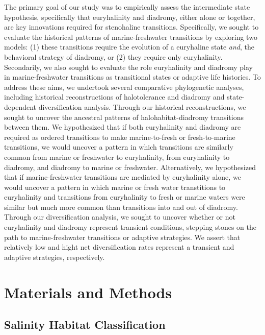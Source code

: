 \documentclass[11pt]{article}
\begin{document}
The primary goal of our study was to empirically assess the intermediate state hypothesis, specifically that euryhalinity and diadromy, either alone or together, are key innovations required for stenohaline transitions. Specifically, we sought to evaluate the historical patterns of marine-freshwater transitions by exploring two models: (1) these transitions require the evolution of a euryhaline state \textit{and}, the behavioral strategy of diadromy, or (2) they require only euryhalinity. Secondarily, we also sought to evaluate the role euryhalinity and diadromy play in marine-freshwater transitions as transitional states or adaptive life histories. To address these aims, we undertook several comparative phylogenetic analyses, including historical reconstructions of halotolerance and diadromy and state-dependent diversification analysis. Through our historical reconstructions, we sought to uncover the ancestral  patterns of halohabitat-diadromy transitions between them. We hypothesized that if both euryhalinity and diadromy are required as ordered transitions to make marine-to-fresh or fresh-to-marine transitions, we would uncover a pattern in which transitions are similarly common from marine or freshwater to euryhalinity, from euryhalinity to diadromy, and diadromy to marine or freshwater. Alternatively, we hypothesized that if marine-freshwater transitions are mediated by euryhalinity alone, we would uncover a pattern in which marine or fresh water transtitions to euryhalinity and transitions from euryhalinity to fresh or marine waters were similar but much more common than transitions into and out of diadromy.  Through our diversification analysis, we sought to uncover whether or not euryhalinity and diadromy represent transient conditions, stepping stones on the path to marine-freshwater transitions or adaptive strategies. We assert that relatively low and hight net diversification rates represent a transient and adaptive strategies, respectively.


\section*{Materials and Methods}

\subsection*{Salinity Habitat Classification}
\end{document}
